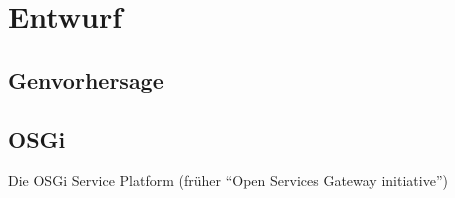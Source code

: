 \chapter{Entwurf}
\section{Genvorhersage}
\section{OSGi}
Die OSGi Service Platform (früher \enquote{Open Services Gateway initiative})

